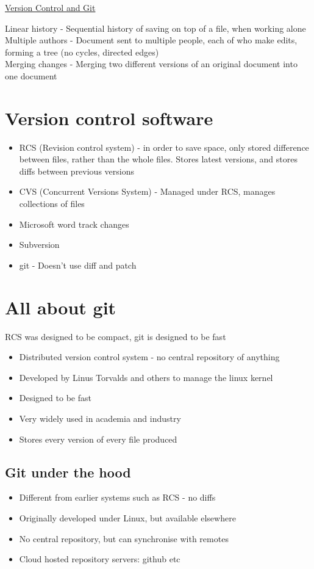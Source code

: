 \documentclass{article}[18pt]
\begin{document}
\begin{center}
\underline{\huge Version Control and Git}
\end{center}
Linear history - Sequential history of saving on top of a file, when working alone\\
Multiple authors - Document sent to multiple people, each of who make edits, forming a tree (no cycles, directed edges)\\
Merging changes - Merging two different versions of an original document into one document
\section{Version control software}
\begin{itemize}
\item RCS (Revision control system) - in order to save space, only stored difference between files, rather than the whole files. Stores latest versions, and stores diffs between previous versions
\item CVS (Concurrent Versions System) - Managed under RCS, manages collections of files
\item Microsoft word track changes
\item Subversion 
\item git - Doesn't use diff and patch
\end{itemize}
\section{All about git}
RCS was designed to be compact, git is designed to be fast
\begin{itemize}
\item Distributed version control system - no central repository of anything
\item Developed by Linus Torvalds and others to manage the linux kernel
\item Designed to be fast
\item Very widely used in academia and industry
\item Stores every version of every file produced
\end{itemize}
\subsection{Git under the hood}
\begin{itemize}
\item Different from earlier systems such as RCS - no diffs
\item Originally developed under Linux, but available elsewhere
\item No central repository, but can synchronise with remotes
\item Cloud hosted repository servers: github etc
\end{itemize}
\end{document}
